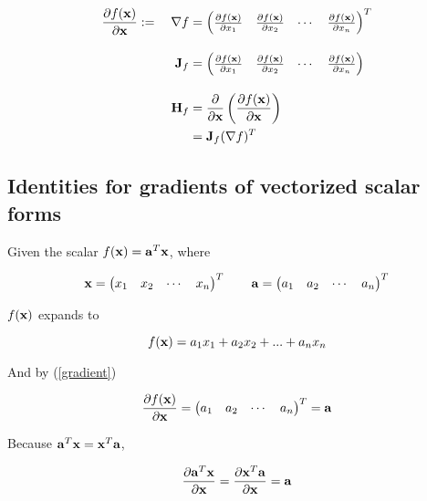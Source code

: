 \documentclass{article}
\newcommand{\vect}[1]{\textbf{\textrm{#1}}}
\newcommand{\pd}[2]{\frac{\partial {#1}}{\partial {#2}}}
\begin{document}
\begin{align}
	\pd{f(\vect{x})}{\vect{x}} := \quad \nabla f & = 
	\begin{pmatrix}
		\pd{f(\vect{x})}{x_1} & \pd{f(\vect{x})}{x_2} & \cdots & \pd{f(\vect{x})}{x_n}
	\end{pmatrix}^{T} \label{gradient} \\[1em]
	\vect{J}_f & = 
	\begin{pmatrix}
		\pd{f(\vect{x})}{x_1} & \pd{f(\vect{x})}{x_2} & \cdots & \pd{f(\vect{x})}{x_n}
	\end{pmatrix} \label{jacobian} \\[1em]
	\vect{H}_f & = \pd{}{\vect{x}} \left( \pd{f(\vect{x})}{\vect{x}} \right) \nonumber \\
	& = \vect{J}_f(\nabla f)^{T} \label{hessian}
\end{align}	

\subsection{Identities for gradients of vectorized scalar forms}
Given the scalar $f(\vect{x}) = \vect{a}^{T}\vect{x}$, where

\begin{equation*}
	\vect{x}= 
	\begin{pmatrix}
		x_1 & x_2 & \cdots & x_n
	\end{pmatrix}^{T}
	\qquad \vect{a} = 
	\begin{pmatrix}
		a_1 & a_2 & \cdots & a_n
	\end{pmatrix}^{T}
\end{equation*}

$f(\vect{x})$ expands to

\begin{equation*}
	f(\vect{x}) = a_1x_1 + a_2x_2 + ... + a_nx_n
\end{equation*}

And by (\ref{gradient})

\begin{equation*}
	\pd{f(\vect{x})}{\vect{x}} = 
	\begin{pmatrix}
		a_1 & a_2 & \cdots & a_n
	\end{pmatrix}^{T} 
	= \vect{a}
\end{equation*}

Because $\vect{a}^{T}\vect{x} = \vect{x}^{T}\vect{a}$,

\begin{equation} \label{scalargradvv}
	\pd{\vect{a}^{T}\vect{x}}{\vect{x}} = \pd{\vect{x}^{T}\vect{a}}{\vect{x}} = \vect{a} \\[2em]
\end{equation} 
\end{document}
